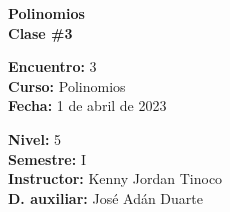 \begin{center} \textbf
{
    \Large Polinomios \\ \vspace{2mm}Clase \#3
}
\end{center}

\begin{multicols}{2}
{
    \textbf{Encuentro:} 3\\
    \textbf{Curso:} Polinomios\\
    \textbf{Fecha:} 1 de abril de 2023\\
    \begin{flushright}
        \textbf{Nivel:} 5\\
        \textbf{Semestre:} I\\
        \textbf{Instructor:} Kenny Jordan Tinoco\\
        \textbf{D. auxiliar: }José Adán Duarte
    \end{flushright}
}
\end{multicols}

\thispagestyle{first-page-style}